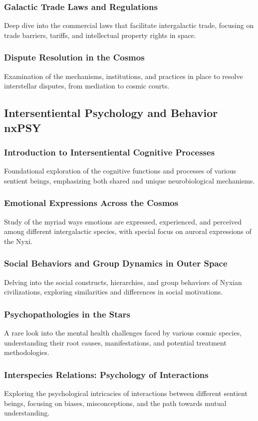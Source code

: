 \subsubsection{Galactic Trade Laws and Regulations}
Deep dive into the commercial laws that facilitate intergalactic trade, focusing on trade barriers, tariffs, and intellectual property rights in space.
\subsubsection{Dispute Resolution in the Cosmos}
Examination of the mechanisms, institutions, and practices in place to resolve interstellar disputes, from mediation to cosmic courts.


\subsection{Intersentiental Psychology and Behavior \hfill nxPSY}
\subsubsection{Introduction to Intersentiental Cognitive Processes}
Foundational exploration of the cognitive functions and processes of various sentient beings, emphasizing both shared and unique neurobiological mechanisms.
\subsubsection{Emotional Expressions Across the Cosmos}
Study of the myriad ways emotions are expressed, experienced, and perceived among different intergalactic species, with special focus on auroral expressions of the Nyxi.
\subsubsection{Social Behaviors and Group Dynamics in Outer Space}
Delving into the social constructs, hierarchies, and group behaviors of Nyxian civilizations, exploring similarities and differences in social motivations.
\subsubsection{Psychopathologies in the Stars}
A rare look into the mental health challenges faced by various cosmic species, understanding their root causes, manifestations, and potential treatment methodologies.
\subsubsection{Interspecies Relations: Psychology of Interactions}
Exploring the psychological intricacies of interactions between different sentient beings, focusing on biases, misconceptions, and the path towards mutual understanding.



